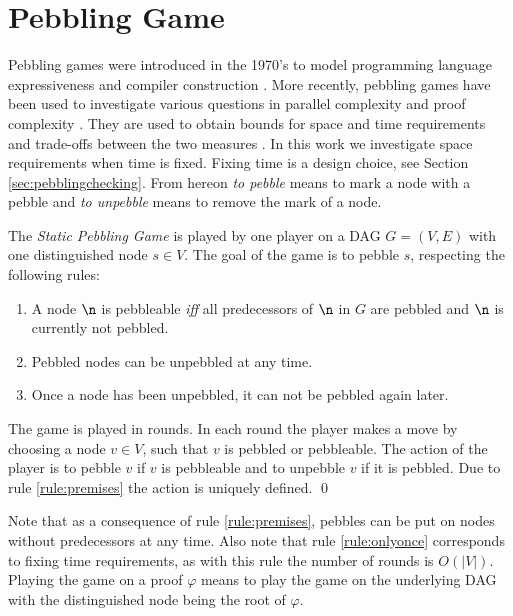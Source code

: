 \section{Pebbling Game}
\label{sec:pebbling-game}

Pebbling games were introduced in the 1970's to model programming language expressiveness \cite{paterson1970comparative,Walker1973404} and compiler construction \cite{sethi1975complete}. 
More recently, pebbling games have been used to investigate various questions in parallel complexity \cite{chan2013pebble} and proof complexity \cite{ben2008short,Esteban200184,nordstrom2009narrow}. They are used to obtain bounds for space and time requirements and trade-offs between the two measures \cite{van1979move,ben2009size}. 
In this work we investigate space requirements when time is fixed.
Fixing time is a design choice, see Section \ref{sec:pebblingchecking}.
From hereon \textit{to pebble} means to mark a node with a pebble and \textit{to unpebble} means to remove the mark of a node.

\begin{definition}
\label{def:pebbling-game}
The \emph{Static Pebbling Game} is played by one player on a DAG $G = (V,E)$ with one distinguished node $s \in V$.
The goal of the game is to pebble $s$, respecting the following rules:
\begin{enumerate}
	\item \label{rule:premises} A node $\n$ is pebbleable \emph{iff} all predecessors of $\n$ in $G$ are pebbled and $\n$ is currently not pebbled.
	\item \label{rule:unpebbling} Pebbled nodes can be unpebbled at any time.
	\item \label{rule:onlyonce} Once a node has been unpebbled, it can not be pebbled again later.
\end{enumerate}
The game is played in rounds.
In each round the player makes a move by choosing a node $v \in V$, such that $v$ is pebbled or pebbleable.
The action of the player is to pebble $v$ if $v$ is pebbleable and to unpebble $v$ if it is pebbled.
Due to rule \ref{rule:premises} the action is uniquely defined.
\qed
\end{definition}

Note that as a consequence of rule \ref{rule:premises}, pebbles can be put on nodes without predecessors at any time.
Also note that rule \ref{rule:onlyonce} corresponds to fixing time requirements, as with this rule the number of rounds is $O(|V|)$.
Playing the game on a proof $\varphi$ means to play the game on the underlying DAG with the distinguished node being the root of $\varphi$.

